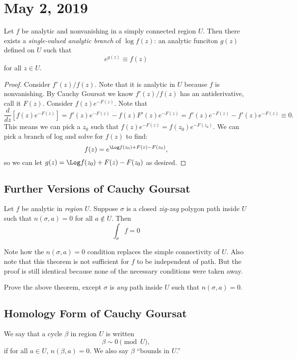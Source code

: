 \section{May 2, 2019}

\begin{theorem}
    Let $f$ be analytic and nonvanishing in a simply connected
    region $U$.
    Then there exists a \textit{single-valued analytic branch} of
    $\log f(z)$:  an analytic funciton $g(z)$ defined
    on $U$ such that 
    \[ e^{g(z)} \equiv f(z) \]
    for all $z \in U$.
\end{theorem}

\begin{proof}
    Consider $f'(z)/f(z)$.
    Note that it is analytic in $U$ because $f$ is nonvanishing.
    By Cauchy Goursat we know $f'(z)/f(z)$ has an antiderivative,
    call it $F(z)$.
    Consider $f(z)e^{-F(z)}$.
    Note that
    \[ \frac{d}{dz} [f(z)e^{-F(z)}] = f'(z)e^{-F(z)} - f(z)F'(z)e^{-F(z)}
    = f'(z)e^{-F(z)} - f'(z) e^{-F(z)} \equiv 0. \]
    This means we can pick a $z_0$ such that $f(z)e^{-F(z)}=
    f(z_0)e^{-F(z_0)}$.
    We can pick a branch of log and solve for $f(z)$ to find:
    \[ f(z) = e^{\Log f(z_0) + F(z) - F(z_0)}, \]
    so we can let $g(z) = \Log f(z_0) + F(z) - F(z_0)$ as
    desired.
\end{proof}

\subsection{Further Versions of Cauchy Goursat}
\begin{theorem}
    Let $f$ be analytic in \textit{region} $U$.
    Suppose $\sigma$ is a closed \textit{zig-zag} polygon path
    inside $U$ such that $n(\sigma, a) = 0$ for all $a \notin U$.
    Then
    \[ \int_{\sigma} f = 0 \]
\end{theorem}
Note how the $n(\sigma, a) = 0$ condition replaces the simple
connectivity of $U$.
Also note that this theorem is not sufficient for $f$ to be
independent of path.
But the proof is still identical because none of the necessary
conditions were taken away.

\begin{exercise}
    Prove the above theorem, except $\sigma$ is \textit{any} path
    inside $U$ such that $n(\sigma, a) = 0$.
\end{exercise}

\subsection{Homology Form of Cauchy Goursat}
\begin{definition}
    We say that a cycle $\beta$ in region $U$ is  written
    \[ \beta \sim 0 \pmod{U}, \]
    if for all $a \in U$, $n(\beta, a) = 0$.
    We also say $\beta$ ``bounds in $U$.''
\end{definition}

